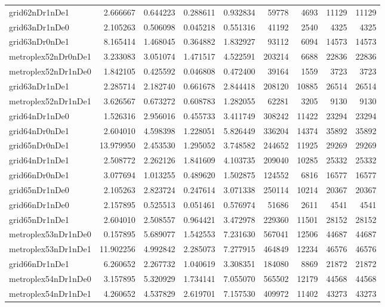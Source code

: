 \begin{longtable}{|l|r|r|r|r|r|r|r|r|}
grid62nDr1nDe1 & 2.666667 & 0.644223 & 0.288611 & 0.932834 & 59778 & 4693 & 11129 & 11129 \\
grid63nDr1nDe0 & 2.105263 & 0.506098 & 0.045218 & 0.551316 & 41192 & 2540 & 4325 & 4325 \\
grid63nDr0nDe1 & 8.165414 & 1.468045 & 0.364882 & 1.832927 & 93112 & 6094 & 14573 & 14573 \\
metroplex52nDr0nDe1 & 3.233083 & 3.051074 & 1.471517 & 4.522591 & 203214 & 6688 & 22836 & 22836 \\
metroplex52nDr1nDe0 & 1.842105 & 0.425592 & 0.046808 & 0.472400 & 39164 & 1559 & 3723 & 3723 \\
grid63nDr1nDe1 & 2.285714 & 2.182740 & 0.661678 & 2.844418 & 208120 & 10885 & 26514 & 26514 \\
metroplex52nDr1nDe1 & 3.626567 & 0.673272 & 0.608783 & 1.282055 & 62281 & 3205 & 9130 & 9130 \\
grid64nDr1nDe0 & 1.526316 & 2.956016 & 0.455733 & 3.411749 & 308242 & 11422 & 23294 & 23294 \\
grid64nDr0nDe1 & 2.604010 & 4.598398 & 1.228051 & 5.826449 & 336204 & 14374 & 35892 & 35892 \\
grid65nDr0nDe1 & 13.979950 & 2.453530 & 1.295052 & 3.748582 & 244652 & 11925 & 29269 & 29269 \\
grid64nDr1nDe1 & 2.508772 & 2.262126 & 1.841609 & 4.103735 & 209040 & 10285 & 25332 & 25332 \\
grid66nDr0nDe1 & 3.077694 & 1.013255 & 0.489620 & 1.502875 & 124552 & 6816 & 16577 & 16577 \\
grid65nDr1nDe0 & 2.105263 & 2.823724 & 0.247614 & 3.071338 & 250114 & 10214 & 20367 & 20367 \\
grid66nDr1nDe0 & 2.157895 & 0.525513 & 0.051461 & 0.576974 & 51686 & 2611 & 4541 & 4541 \\
grid65nDr1nDe1 & 2.604010 & 2.508557 & 0.964421 & 3.472978 & 229360 & 11501 & 28152 & 28152 \\
metroplex53nDr1nDe0 & 0.157895 & 5.689077 & 1.542553 & 7.231630 & 567041 & 12506 & 44687 & 44687 \\
metroplex53nDr1nDe1 & 11.902256 & 4.992842 & 2.285073 & 7.277915 & 464849 & 12234 & 46576 & 46576 \\
grid66nDr1nDe1 & 6.260652 & 2.267732 & 1.040619 & 3.308351 & 184080 & 8869 & 21872 & 21872 \\
metroplex54nDr1nDe0 & 3.157895 & 5.320929 & 1.734141 & 7.055070 & 565502 & 12179 & 44568 & 44568 \\
metroplex54nDr1nDe1 & 4.260652 & 4.537829 & 2.619701 & 7.157530 & 409972 & 11402 & 43273 & 43273 \\

\end{longtable}
